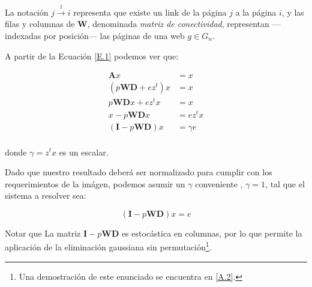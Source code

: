 \noindent La notación $j \stackrel{l}{\longrightarrow} i$ representa que existe un link de la página $j$ a la página $i$, y las filas y columnas de $\textbf{W}$, denominada \textit{matriz de conectividad}, representan ---indexadas por posición--- las páginas de una web $g \in G_n$.
\vspace{1em}

\noindent A partir de la Ecuación \ref{E.1} podemos ver que:

\begin{align*}
    \textbf{A}x &= x \\
    (p\textbf{W}\textbf{D} + ez^t)x &= x \\
    p\textbf{W}\textbf{D}x + ez^tx &= x \\
    x - p\textbf{W}\textbf{D}x &= ez^tx \\
    (\textbf{I} - p\textbf{W}\textbf{D})x &= \gamma e \\
\end{align*}

\noindent donde $\gamma = z^tx$ es un escalar.
\vspace{1em}

Dado que nuestro resultado deberá ser normalizado para cumplir con los requerimientos de la imágen, %
podemos asumir un $\gamma$ conveniente \cite{Langville04}, $\gamma = 1$, tal que el sistema a resolver sea:
\vspace{1em}

\begin{equation}\label{E.2}
    (\textbf{I} - p\textbf{W}\textbf{D})x = e
\end{equation}
\vspace{1em}

Notar que La matriz $\textbf{I} - p\textbf{W}\textbf{D}$ es estocástica en columnas, por lo que permite la aplicación de la eliminación gaussiana sin permutación\footnote{Una demostración de este enunciado se encuentra en \ref{A.2}.}.
